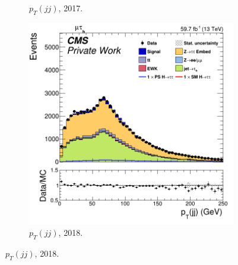 \begin{figure}
\begin{subfigure}[b]{0.33\linewidth}
    \caption{$p_T(jj)$, 2017.} 
    \vspace{0.5ex}
  \end{subfigure} 
    \begin{subfigure}[b]{0.33\linewidth}
    \centering
    \includegraphics[width=\linewidth]{Chapitre7/Images/CtrlPlots/2018/DijetpT.png} 
    \caption{$p_T(jj)$, 2018.} 
    \vspace{0.5ex}
  \end{subfigure} 


\end{figure}
